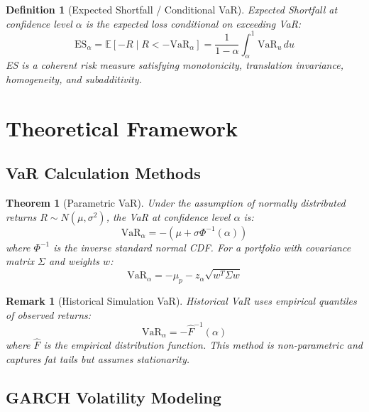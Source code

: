 \documentclass[11pt,a4paper]{article}
\newtheorem{definition}{Definition}[section]
\newtheorem{theorem}{Theorem}[section]
\newtheorem{remark}{Remark}[section]
\begin{document}
\begin{definition}[Expected Shortfall / Conditional VaR]
Expected Shortfall at confidence level $\alpha$ is the expected loss conditional on exceeding VaR:
\begin{equation}
\text{ES}_\alpha = \mathbb{E}[-R \mid R < -\text{VaR}_\alpha] = \frac{1}{1-\alpha}\int_\alpha^1 \text{VaR}_u \, du
\end{equation}
ES is a coherent risk measure satisfying monotonicity, translation invariance, homogeneity, and subadditivity.
\end{definition}

\section{Theoretical Framework}

\subsection{VaR Calculation Methods}

\begin{theorem}[Parametric VaR]
Under the assumption of normally distributed returns $R \sim N(\mu, \sigma^2)$, the VaR at confidence level $\alpha$ is:
\begin{equation}
\text{VaR}_\alpha = -(\mu + \sigma \Phi^{-1}(\alpha))
\end{equation}
where $\Phi^{-1}$ is the inverse standard normal CDF. For a portfolio with covariance matrix $\Sigma$ and weights $w$:
\begin{equation}
\text{VaR}_\alpha = -\mu_p - z_\alpha\sqrt{w^T\Sigma w}
\end{equation}
\end{theorem}

\begin{remark}[Historical Simulation VaR]
Historical VaR uses empirical quantiles of observed returns:
\begin{equation}
\text{VaR}_\alpha = -\hat{F}^{-1}(\alpha)
\end{equation}
where $\hat{F}$ is the empirical distribution function. This method is non-parametric and captures fat tails but assumes stationarity.
\end{remark}

\subsection{GARCH Volatility Modeling}
\end{document}

